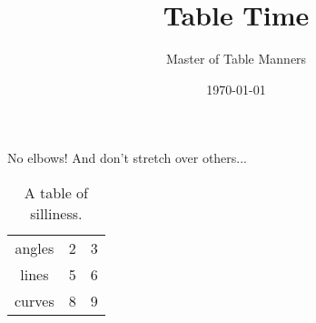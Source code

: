 \documentclass[a4paper,11pt]{article}
\title{Table Time}
\author{Master of Table Manners}
\date{\today}
\begin{document}
\maketitle
No elbows! And don't stretch over others...
\begin{table}[h]
\begin{center}
\begin{tabular}{ccc}
  angles & 2 & 3 \\
  lines & 5 & 6 \\
  curves & 8 & 9 \\
\end{tabular}
\end{center}
\caption{A table of silliness.}
\end{table}
\end{document}

